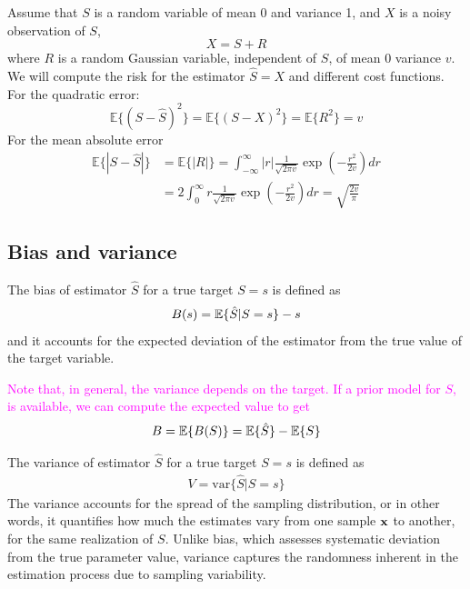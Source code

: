 \begin{example}
Assume that $S$ is a random variable of mean 0 and variance 1, and $X$ is a noisy observation of $S$,
\begin{equation}
X = S + R
\end{equation}
where $R$ is a random Gaussian variable, independent of $S$, of mean $0$ variance $v$. We will compute the risk for the estimator $\hat{S} = X$ and different cost functions. For the quadratic error:
\begin{equation}
\mathbb{E}\{(S-\hat{S})^2\} = \mathbb{E}\{(S-X)^2\} = \mathbb{E}\{R^2\} = v
\end{equation}
For the mean absolute error
\begin{align}
\mathbb{E}\{|S-\hat{S}|\}
    &= \mathbb{E}\{|R|\} 
     = \int_{-\infty}^{\infty} |r| \frac{1}{\sqrt{2\pi v}}\exp\left(-\frac{r^2}{2v}\right)dr 
\nonumber\\
    &= 2 \int_{0}^{\infty} r \frac{1}{\sqrt{2\pi v}}\exp\left(-\frac{r^2}{2v}\right)dr 
     = \sqrt{\frac{2v}{\pi}}
\end{align}
\end{example}\vspace{0.4cm}


\subsection{Bias and variance}
\label{subsec_funcion_coste}

The bias of estimator $\hat S$ for a true target $S=s$ is defined as
\begin{align}
B(s) = \mathbb{E}\{\hat S|S=s\} - s
\end{align}
and it accounts for the expected deviation of the estimator from the true value of the target variable.

\textcolor{magenta}{Note that, in general, the variance depends on the target. If a prior model for $S$, is available, we can compute the expected value to get
\begin{align}
B = \mathbb{E}\{B(S)\} = \mathbb{E}\{\hat S\} - \mathbb{E}\{S\}
\end{align}}

The variance of estimator $\hat S$ for a true target $S=s$ is defined as
\begin{align}
V = \text{var}\{\hat S|S=s\} 
\end{align}
The variance accounts for the spread of the sampling distribution, or in other words, it quantifies how much the estimates vary from one sample ${\bf x}$ to another, for the same realization of $S$. Unlike bias, which assesses systematic deviation from the true parameter value, variance captures the randomness inherent in the estimation process due to sampling variability.


